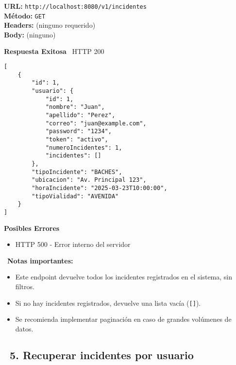 \begin{tcolorbox}[request]
    \textbf{URL:} \textcolor{urlColor}{\texttt{http://localhost:8080/v1/incidentes}}\\
    \textbf{Método:} \textcolor{methodColor}{\texttt{GET}}\\
    \textbf{Headers:} (ninguno requerido)\\
    \textbf{Body:} (ninguno)
\end{tcolorbox}

\begin{tcolorbox}[response]
    \textbf{Respuesta Exitosa} \faCheckCircle\ \textcolor{successColor}{HTTP 200}
    \begin{verbatim}
[
    {
        "id": 1,
        "usuario": {
            "id": 1,
            "nombre": "Juan",
            "apellido": "Perez",
            "correo": "juan@example.com",
            "password": "1234",
            "token": "activo",
            "numeroIncidentes": 1,
            "incidentes": []
        },
        "tipoIncidente": "BACHES",
        "ubicacion": "Av. Principal 123",
        "horaIncidente": "2025-03-23T10:00:00",
        "tipoVialidad": "AVENIDA"
    }
]
    \end{verbatim}
    
    \textbf{Posibles Errores} \faExclamationTriangle
    \begin{itemize}
        \item \textcolor{errorColor}{HTTP 500} - Error interno del servidor
    \end{itemize}
\end{tcolorbox}

\begin{tcolorbox}[notes]
    \faInfoCircle\ \textbf{Notas importantes:}
    \begin{itemize}
        \item Este endpoint devuelve todos los incidentes registrados en el sistema, sin filtros.
        \item Si no hay incidentes registrados, devuelve una lista vacía (\texttt{[]}).
        \item Se recomienda implementar paginación en caso de grandes volúmenes de datos.
    \end{itemize}
\end{tcolorbox}



\subsection*{\faServer\ 5. Recuperar incidentes por usuario}

